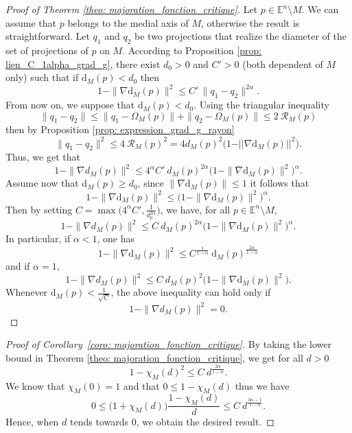 \documentclass[11pt,reqno,a4paper]{article}%
\theoremstyle{definition}
\theoremstyle{remark}
\renewcommand{\leq}{\leqslant}
\renewcommand{\geq}{\geqslant}
\renewcommand{\d}{\mathrm{d}}
\newcommand{\E}{\mathbb{E}}
\renewcommand{\d}{\mathrm{d}}
\begin{document}
\begin{proof}[Proof of Theorem \ref{theo: majoration_fonction_critique}]
Let $p \in \E^n \setminus M$. We can assume that $p$ belongs to the medial axis of $M$, otherwise the result is straightforward.
Let $q_1$ and $q_2$ be two projections that realize the diameter of the set of projections of $p$ on $M$.
According to Proposition \ref{prop: lien_C_1alpha_grad_g}, there exist $d_0 > 0$ and $C' > 0$ (both dependent of $M$ only) such that if $\d_M(p) < d_0$ then 
\[ 1 - \| \nabla \d_M(p) \|^2 \leq C' \, \|q_1-q_2\|^{2 \alpha} .\]
From now on, we suppose that $\d_M(p) < d_0$.
Using the triangular inequality
$$\| q_1 - q_2\| \leq \| q_1 - \Omega_M(p)\| + \| q_2 -  \Omega_M(p)\| \leq 2 ~ \mathscr{R}_M(p)$$
then by Proposition \ref{prop: expression_grad_g_rayon}
$$\| q_1 - q_2\|^2 \leq 4 ~\mathscr{R}_M(p)^2 = 4 d_M(p)^2 \Big( 1 - \vert \vert \nabla \d_M(p) \vert \vert^2 \Big).$$ 
Thus, we get that
$$ 1 - \| \nabla d_M(p) \|^2  \leq 4 ^\alpha C' ~d_M(p)^{2 \alpha} \Big( 1 - \| \nabla \d_M(p) \|^2 \Big)^{\alpha}.$$
Assume now that $\d_M(p) \geq d_0$, since $ \| \nabla \d_M(p) \| \leq 1$ it follows that
$$1 - \| \nabla \d_M(p) \|^2 \leq \big( 1 - \| \nabla \d_M(p) \|^2 \big)^\alpha.$$ 
Then by setting $C = \max \big( 4 ^\alpha C' , \frac{1}{d_0^{2 \alpha}} \big)$, we have, for all $p \in \E^n \setminus M$,
$$ 1 - \| \nabla d_M(p) \|^2  \leq C ~d_M(p)^{2 \alpha} \Big( 1 - \| \nabla \d_M(p) \|^2 \Big)^{\alpha}.$$
In particular, if $\alpha < 1$, one has
$$ 1 - \| \nabla \d_M(p) \|^2  \leq C^{\frac{1}{1 - \alpha}} ~ \d_M(p)^{\frac{2 \alpha}{1- \alpha}}$$
and if $\alpha = 1,$
$$ 1 - \| \nabla d_M(p) \|^2  \leq C ~d_M(p)^{2} \Big( 1 - \| \nabla \d_M(p) \|^2 \Big).$$
Whenever $\d_M(p) < \frac{1}{\sqrt{C}}$, the above inequality can hold only if
$$1 - \| \nabla d_M(p) \|^2 = 0.$$
\end{proof}

\begin{proof}[Proof of Corollary~\ref{coro: majoration_fonction_critique}]
By taking the lower bound in Theorem \ref{theo: majoration_fonction_critique}, we get for all $d > 0$
$$ 1 - \chi_M(d)^2 \leq C ~ d^{\frac{2 \alpha}{1- \alpha}}.$$
We know that $\chi_M(0) = 1$ and that $0 \leq 1 - \chi_M(d)$ thus we have
$$0 \leq \big( 1+\chi_M(d) \big) \frac{1- \chi_M(d)}{d} \leq C ~ d^{\frac{3\alpha - 1}{1- \alpha}}.$$
Hence, when $d$ tends towards $0$, we obtain the desired result.
\end{proof}


\end{document}
